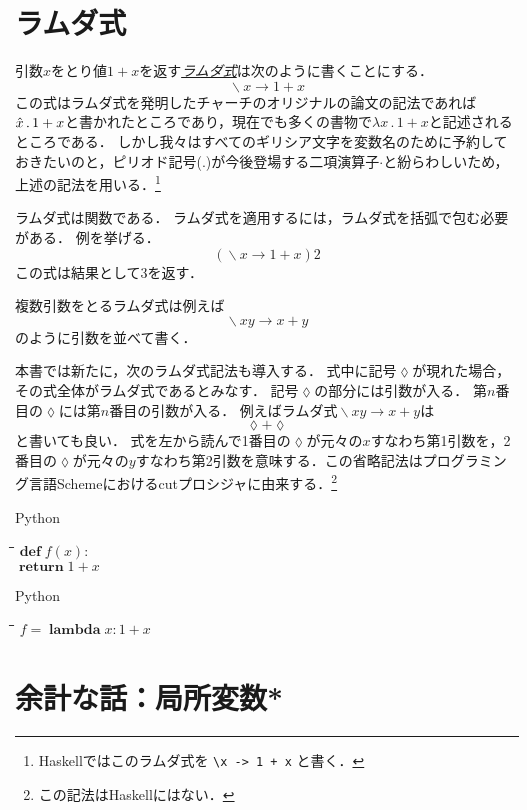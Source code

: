 \documentclass[twocolumn]{jsbook}
\newcommand{\keyword}[1]{\underline{\emph{#1}}}
\newcommand{\code}[1]{\texttt{#1}}
\newenvironment{pythoncode}{\begin{itembox}[r]{Python}}{\end{itembox}}
\newenvironment{python}{\begin{tabbing}\hspace*{2em}\=\hspace*{2em}\=\hspace*{2em}\=\hspace*{2em}\=\kill}{\end{tabbing}}
\newcommand{\pthnKeyword}[1]{\textbf{#1}}
\DeclareMathOperator{\pthnLambda}{\pthnKeyword{lambda}}
\DeclareMathOperator{\mathLambda}{\backslash}
\newcommand{\mathLambdaAnonymousParameter}{\lozenge}
\newcommand{\mathLambdaArrow}{\rightarrow}
\newcommand{\mathLambdaExpression}[2]{\mathLambda#1\mathLambdaArrow#2}
\begin{document}
\section{ラムダ式}
引数$x$をとり値$1+x$を返す\keyword{ラムダ式}は次のように書くことにする．
$$\mathLambdaExpression{x}{1+x}$$
この式はラムダ式を発明したチャーチのオリジナルの論文の記法であれば$\Hat x\,.\,1+x$と書かれたところであり，現在でも多くの書物で$\lambda x\,.\,1+x$と記述されるところである．
しかし我々はすべてのギリシア文字を変数名のために予約しておきたいのと，ピリオド記号($.$)が今後登場する二項演算子$\cdot$と紛らわしいため，上述の記法を用いる．\footnote{Haskellではこのラムダ式を \code{\textbackslash x -> 1 + x} と書く．}

ラムダ式は関数である．
ラムダ式を適用するには，ラムダ式を括弧で包む必要がある．
例を挙げる．
$$\left(\mathLambdaExpression{x}{1+x}\right)2$$
この式は結果として$3$を返す．

複数引数をとるラムダ式は例えば$$\mathLambdaExpression{xy}{x+y}$$のように引数を並べて書く．

本書では新たに，次のラムダ式記法も導入する．
式中に記号$\mathLambdaAnonymousParameter$が現れた場合，その式全体がラムダ式であるとみなす．
記号$\mathLambdaAnonymousParameter$の部分には引数が入る．
第$n$番目の$\mathLambdaAnonymousParameter$には第$n$番目の引数が入る．
例えばラムダ式$\mathLambdaExpression{xy}{x+y}$は$$\mathLambdaAnonymousParameter+\mathLambdaAnonymousParameter$$と書いても良い．
式を左から読んで1番目の$\mathLambdaAnonymousParameter$が元々の$x$すなわち第1引数を，2番目の$\mathLambdaAnonymousParameter$が元々の$y$すなわち第2引数を意味する．この省略記法はプログラミング言語Schemeにおけるcutプロシジャに由来する．\footnote{この記法はHaskellにはない．}

\begin{pythoncode}
\begin{python}
$\textbf{def}\;f(x):$\\
\>$\mathop{\textbf{return}}1+x$
\end{python}
\end{pythoncode}

\begin{pythoncode}
\begin{python}
$f=\pthnLambda x:1+x$
\end{python}
\end{pythoncode}

\section*{余計な話：局所変数*}
\end{document}

